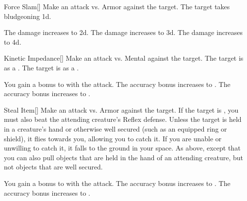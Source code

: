 \lowercase{\hypertarget{spell:Force Slam}{}}\label{spell:Force Slam}
\begin{freeability}[Rank 1]{\hypertarget{spell:Force Slam}{Force Slam}}[]
Make an attack vs. Armor against the target.
\hit The target takes bludgeoning  \plus1d.

\rankline
{} The damage increases to  \plus2d.
 The damage increases to  \plus3d.
 The damage increases to  \plus4d.
\end{freeability}
\vspace{0.25em}



\lowercase{\hypertarget{spell:Kinetic Impedance}{}}\label{spell:Kinetic Impedance}
\begin{freeability}[Rank 1]{\hypertarget{spell:Kinetic Impedance}{Kinetic Impedance}}[]
Make an attack vs. Mental against the target.
\hit The target is  as a .
\crit The target is  as a .

\rankline
{} You gain a  bonus to  with the attack.
 The accuracy bonus increases to .
 The accuracy bonus increases to .
\end{freeability}
\vspace{0.25em}



\lowercase{\hypertarget{spell:Steal Item}{}}\label{spell:Steal Item}
\begin{freeability}[Rank 1]{\hypertarget{spell:Steal Item}{Steal Item}}[]
Make an attack vs. Armor against the target.
If the target is , you must also beat the attending creature's Reflex defense.
\hit Unless the target is held in a creature's hand or otherwise well secured (such as an equipped ring or shield), it flies towards you, allowing you to catch it.
If you are unable or unwilling to catch it, it falls to the ground in your space.
\crit As above, except that you can also pull objects that are held in the hand of an attending creature, but not objects that are well secured.

\rankline
{} You gain a  bonus to  with the attack.
 The accuracy bonus increases to .
 The accuracy bonus increases to .
\end{freeability}
\vspace{0.25em}



